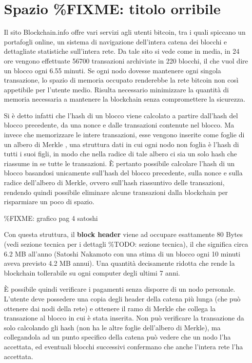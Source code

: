 \section{Spazio \%FIXME: titolo
orribile}\label{spazio-fixme-titolo-orribile}

Il sito Blockchain.info \cite{blockchain-info} offre vari servizi agli
utenti bitcoin, tra i quali spiccano un portafogli online, un sistema di
navigazione dell'intera catena dei blocchi e dettagliate statistiche
sull'intera rete. Da tale sito si vede come in media, in 24 ore vengono
effettuate 56700 transazioni archiviate in 220 blocchi, il che vuol dire
un blocco ogni 6.55 minuti. Se ogni nodo dovesse mantenere ogni singola
transazione, lo spazio di memoria occupato renderebbe la rete bitcoin
non così appetibile per l'utente medio. Risulta necessario minimizzare
la quantità di memoria necessaria a mantenere la blockchain senza
compromettere la sicurezza.

Si è detto infatti che l'hash di un blocco viene calcolato a partire
dall'hash del blocco precedente, da una nonce e dalle transazioni
contenute nel blocco. Ma invece che memorizzare le intere transazioni,
esse vengono inserite come foglie di un albero di Merkle \cite{merkle},
una struttura dati in cui ogni nodo non foglia è l'hash di tutti i suoi
figli, in modo che nella radice di tale albero ci sia un solo hash che
riassume in se tutte le transazioni. È pertanto possibile calcolare
l'hash di un blocco basandosi unicamente sull'hash del blocco
precedente, sulla nonce e sulla radice dell'albero di Merkle, ovvero
sull'hash riassuntivo delle transazioni, rendendo quindi possibile
eliminare alcune transazioni dalla blockchain per risparmiare un poco di
spazio.

\%FIXME: grafico pag 4 satoshi

Con questa struttura, il \textbf{block header} viene ad occupare
esattamente 80 Bytes (vedi sezione tecnica per i dettagli \%TODO:
sezione tecnica), il che significa circa 6.2 MB all'anno (Satoshi
Nakamoto con una stima di un blocco ogni 10 minuti aveva previsto 4.2 MB
annui). Una quantità decisamente ridotta che rende la blockchain
tollerabile su ogni computer degli ultimi 7 anni.

È possibile quindi verificare i pagamenti senza disporre di un nodo
personale. L'utente deve possedere una copia degli header della catena
più lunga (che può ottenere dai nodi della rete) e ottenere il ramo di
Merkle che collega la transazione al blocco in cui è stata inserita. Non
può verificare la transazione da solo calcolando gli hash (non ha le
altre foglie dell'albero di Merkle), ma collegandola ad un punto
specifico della catena può vedere che un nodo l'ha accettata, ed
eventuali blocchi successivi confermano che anche l'intera rete l'ha
accettata.

